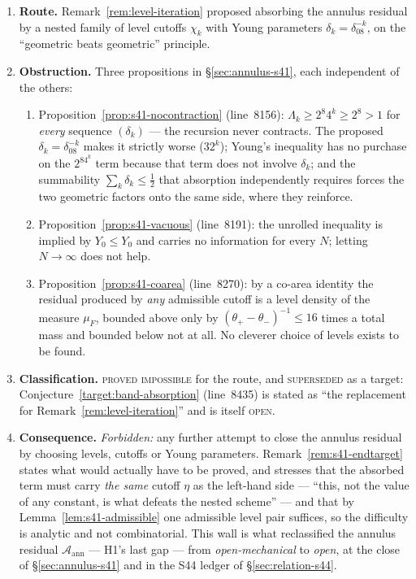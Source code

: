 \documentclass[11pt]{article}
\theoremstyle{definition}
\theoremstyle{remark}
\begin{document}
\begin{enumerate}[label=(\alph*),leftmargin=2.2em]
  \item \textbf{Route.} Remark~\ref{rem:level-iteration} proposed absorbing
    the annulus residual by a nested family of level cutoffs
    $\chi_k$ with Young parameters $\delta_k=\delta_08^{-k}$, on the
    ``geometric beats geometric'' principle.
  \item \textbf{Obstruction.} Three propositions in
    \S\ref{sec:annulus-s41}, each independent of the others:
    \begin{enumerate}[label=\textup{(\roman*)},leftmargin=2.6em]
      \item Proposition~\ref{prop:s41-nocontraction} (line~8156):
        $\Lambda_k\geq 2^8 4^k\geq 2^8>1$ for \emph{every} sequence
        $(\delta_k)$ --- the recursion never contracts. The proposed
        $\delta_k=\delta_08^{-k}$ makes it strictly worse ($32^k$); Young's
        inequality has no purchase on the $2^84^k$ term because that term
        does not involve $\delta_k$; and the summability
        $\sum_k\delta_k\leq\tfrac12$ that absorption independently requires
        forces the two geometric factors onto the same side, where they
        reinforce.
      \item Proposition~\ref{prop:s41-vacuous} (line~8191): the unrolled
        inequality is implied by $Y_0\leq Y_0$ and carries no information for
        every $N$; letting $N\to\infty$ does not help.
      \item Proposition~\ref{prop:s41-coarea} (line~8270): by a co-area
        identity the residual produced by \emph{any} admissible cutoff is a
        level density of the measure $\mu_F$, bounded above only by
        $(\theta_+-\theta_-)^{-1}\leq16$ times a total mass and bounded below
        not at all. No cleverer choice of levels exists to be found.
    \end{enumerate}
  \item \textbf{Classification.} \textsc{proved impossible} for the route, and
    \textsc{superseded} as a target: Conjecture~\ref{target:band-absorption}
    (line~8435) is stated as ``the replacement for
    Remark~\ref{rem:level-iteration}'' and is itself \textsc{open}.
  \item \textbf{Consequence.} \emph{Forbidden:} any further attempt to close
    the annulus residual by choosing levels, cutoffs or Young parameters.
    Remark~\ref{rem:s41-endtarget} states what would actually have to be
    proved, and stresses that the absorbed term must carry \emph{the same}
    cutoff $\eta$ as the left-hand side --- ``this, not the value of any
    constant, is what defeats the nested scheme'' --- and that by
    Lemma~\ref{lem:s41-admissible} one admissible level pair suffices, so the
    difficulty is analytic and not combinatorial. This wall is what
    reclassified the annulus residual $\mathcal{A}_{\mathrm{ann}}$ --- H1's
    last gap --- from \emph{open-mechanical} to \emph{open}, at the close of
    \S\ref{sec:annulus-s41} and in the S44 ledger of
    \S\ref{sec:relation-s44}.
\end{enumerate}
\end{document}
